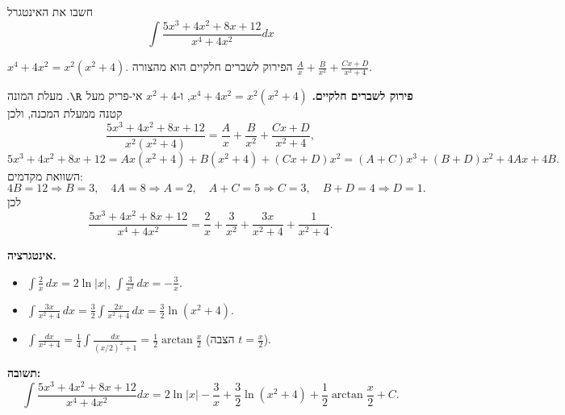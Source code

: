 
\begin{question}
חשבו את האינטגרל
\[ \int\frac{5x^3+4x^2+8x+12}{x^4+4x^2}dx \]
\end{question}

\begin{hint}
$x^4+4x^2=x^2(x^2+4)$. הפירוק לשברים חלקיים הוא מהצורה $\frac Ax+\frac B{x^2}+\frac{Cx+D}{x^2+4}$.
\end{hint}

\begin{solution}
\textbf{פירוק לשברים חלקיים.} $x^4+4x^2=x^2(x^2+4)$, ו-$x^2+4$ אי-פריק מעל $\R$. מעלת המונה קטנה ממעלת המכנה, ולכן
\[ \frac{5x^3+4x^2+8x+12}{x^2(x^2+4)}=\frac Ax+\frac B{x^2}+\frac{Cx+D}{x^2+4}, \]
\[ 5x^3+4x^2+8x+12=Ax(x^2+4)+B(x^2+4)+(Cx+D)x^2=(A+C)x^3+(B+D)x^2+4Ax+4B. \]
השוואת מקדמים:
\[ 4B=12\Rightarrow B=3,\quad 4A=8\Rightarrow A=2,\quad A+C=5\Rightarrow C=3,\quad B+D=4\Rightarrow D=1. \]
לכן
\[ \frac{5x^3+4x^2+8x+12}{x^4+4x^2}=\frac2x+\frac3{x^2}+\frac{3x}{x^2+4}+\frac{1}{x^2+4}. \]

\textbf{אינטגרציה.}
\begin{itemize}
  \item $\int\frac2x\,dx=2\ln|x|$, \quad $\int\frac3{x^2}\,dx=-\frac3x$.
  \item $\int\frac{3x}{x^2+4}\,dx=\frac32\int\frac{2x}{x^2+4}\,dx=\frac32\ln(x^2+4)$.
  \item $\int\frac{dx}{x^2+4}=\frac14\int\frac{dx}{(x/2)^2+1}=\frac12\arctan\frac x2$ (הצבה $t=\frac x2$).
\end{itemize}

\textbf{תשובה:}
\[ \int\frac{5x^3+4x^2+8x+12}{x^4+4x^2}dx=\boxed{2\ln|x|-\frac3x+\frac32\ln(x^2+4)+\frac12\arctan\frac x2+C}. \]
\end{solution}
